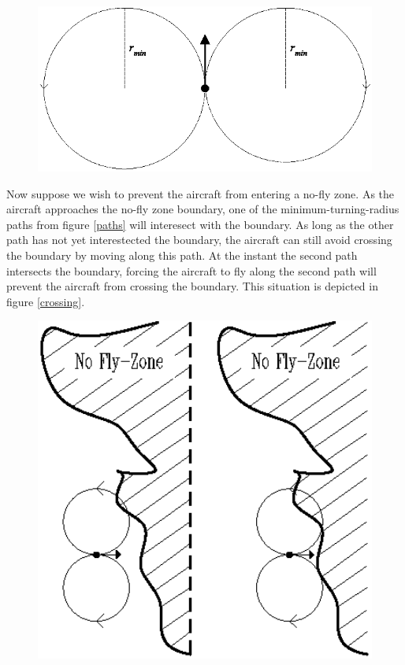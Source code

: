 \documentclass[11pt]{article}
\begin{document}
\begin{figure}[btp]
\centering
\includegraphics[width=5in]{aircraftpaths.eps}
\end{figure}

Now suppose we wish to prevent the aircraft from entering a no-fly
zone.  As the aircraft approaches the no-fly zone boundary, one of the
minimum-turning-radius paths from figure \ref{paths} will interesect
with the boundary.  As long as the other path has not yet
interestected the boundary, the aircraft can still avoid crossing the
boundary by moving along this path.  At the instant the second path
intersects the boundary, forcing the aircraft to fly along the second
path will prevent the aircraft from crossing the boundary.  This
situation is depicted in figure \ref{crossing}.

\begin{figure}[btp]
\centering
\includegraphics[width=5in]{boundarycross.eps}
\end{figure}
\end{document}
